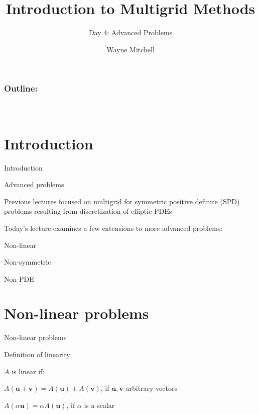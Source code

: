 \documentclass[18pt,xcolor=table]{beamer}
\title[Multigrid]{Introduction to Multigrid Methods}
\subtitle{Day 4: Advanced Problems}
\author[Mitchell]{Wayne Mitchell}
\institute{\pgfuseimage{logo}\\Universit\"at Heidelberg\\Institut f\"ur Technische Informatik}
\date[]{\alert{}}
\begin{document}


\DeclareRobustCommand{\Chi}{\raisebox{2pt}{$\chi$}}

\begin{frame}
\frametitle{\bf Outline:}
\framesubtitle{~~}
\tableofcontents
\end{frame}


\section{Introduction}

\begin{frame}{Introduction}
\begin{block}{Advanced problems}
\bit
\item Previous lectures focused on multigrid for symmetric positive definite (SPD) problems resulting from discretization of elliptic PDEs
\item Today's lecture examines a few extensions to more advanced problems:
\bit
\item Non-linear
\item Non-symmetric
\item Non-PDE
\eit
\eit
\end{block}
\end{frame}


\section{Non-linear problems}


\begin{frame}{Non-linear problems}
\begin{block}{Definition of linearity}
\bit
\item $A$ is linear if:
\bit
\item $A(\mathbf{u} + \mathbf{v}) = A(\mathbf{u}) + A(\mathbf{v})$, if $\mathbf{u},\mathbf{v}$ arbitrary vectors
\item $A(\alpha\mathbf{u}) = \alpha A(\mathbf{u})$, if $\alpha$ is a scalar
\eit
\eit
\end{block}
\end{frame}
\end{document}
